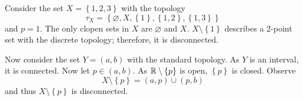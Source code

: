 \documentclass[a4paper, answers]{exam}
\begin{document}
\begin{questions}
\begin{solution}
		Consider the set $X = \left\{
			1,2,3
		\right\}$
		with the topology
		\[
			\tau_X = \left\{
				\varnothing,
				X,
				\left\{
					1
				\right\},
				\left\{
					1,2
				\right\},
				\left\{
					1,3
				\right\}
			\right\}
		\]
		and $p = 1$.
		The only clopen sets in $X$ are $\varnothing$ and $X$.
		$X \setminus \left\{
			1
		\right\}$ describes a 2-point set with the discrete topology;
		therefore, it is disconnected.

		Now consider the set $Y = (a,b)$ with the standard topology.
		As $Y$ is an interval, it is connected.
		Now let $p \in (a,b)$.
		As $\mathbb{R} \setminus \left\{
			p
		\right\}$ is open, $\left\{
			p
		\right\}$ is closed.
		Observe
		\[
			X \setminus \left\{
				p
			\right\} = (a,p) \cup (p,b)
		\]
		and thus $X \setminus \left\{
			p
		\right\}$ is disconnected.
	\end{solution}
\end{questions}
\end{document}
